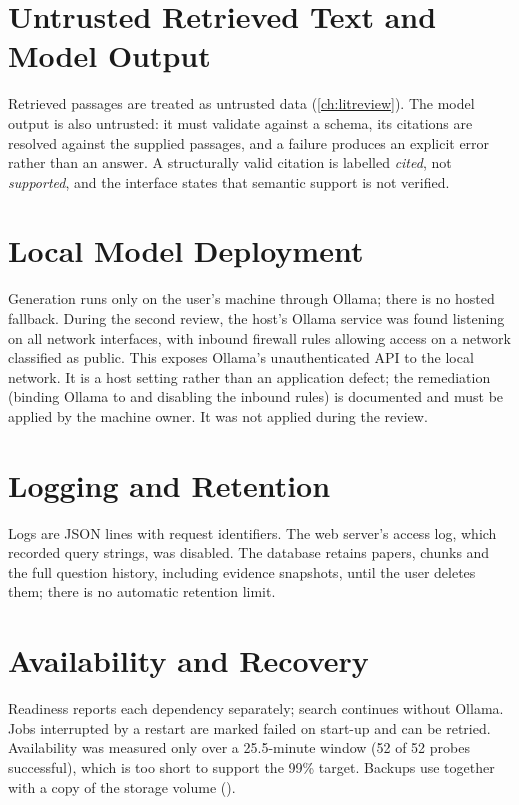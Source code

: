 \section{Untrusted Retrieved Text and Model Output}

Retrieved passages are treated as untrusted data (\autoref{ch:litreview}). The model output is also untrusted: it
must validate against a schema, its citations are resolved against the supplied passages, and a failure produces an
explicit error rather than an answer. A structurally valid citation is labelled \emph{cited}, not \emph{supported},
and the interface states that semantic support is not verified.

\section{Local Model Deployment}

Generation runs only on the user's machine through Ollama; there is no hosted fallback. During the second review,
the host's Ollama service was found listening on all network interfaces, with inbound firewall rules allowing access
on a network classified as public. This exposes Ollama's unauthenticated API to the local network. It is a host
setting rather than an application defect; the remediation (binding Ollama to  and disabling the
inbound rules) is documented and must be applied by the machine owner. It was not applied during the review.

\section{Logging and Retention}

Logs are JSON lines with request identifiers. The web server's access log, which recorded query strings, was
disabled. The database retains papers, chunks and the full question history, including evidence snapshots, until
the user deletes them; there is no automatic retention limit.

\section{Availability and Recovery}

Readiness reports each dependency separately; search continues without Ollama. Jobs interrupted by a restart are
marked failed on start-up and can be retried. Availability was measured only over a 25.5-minute window (52 of 52
probes successful), which is too short to support the 99\% target. Backups use  together with a copy
of the storage volume ().

